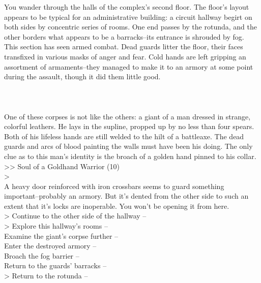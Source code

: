 You wander through the halls of the complex’s second floor. The floor's layout appears to be typical for an administrative building: a circuit hallway begirt on both sides by concentric series of rooms. One end passes by the rotunda, and the other borders what appears to be a barracks--its entrance is shrouded by fog.\\

This section has seen armed combat. Dead guards litter the floor, their faces transfixed in various masks of anger and fear. Cold hands are left gripping an assortment of armaments--they managed to make it to an armory at some point during the assault, though it did them little good.\\
\\
\\
\\


One of these corpses is not like the others: a giant of a man dressed in strange, colorful leathers. He lays in the supline, propped up by no less than four spears. Both of his lifeless hands are still welded to the hilt of a battleaxe. The dead guards and arcs of blood painting the walls must have been his doing. The only clue as to this man's identity is the broach of a golden hand pinned to his collar.\\
>> Soul of a Goldhand Warrior (10)\\
>\\

A heavy door reinforced with iron crossbars seems to guard something important--probably an armory. But it's dented from the other side to such an extent that it's locks are inoperable. You won't be opening it from here.\\

> Continue to the other side of the hallway -- \\
> Explore this hallway's rooms -- \\
 Examine the giant's corpse further -- \\
 Enter the destroyed armory -- \\
 Broach the fog barrier -- \\
 Return to the guards' barracks -- \\
> Return to the rotunda -- 